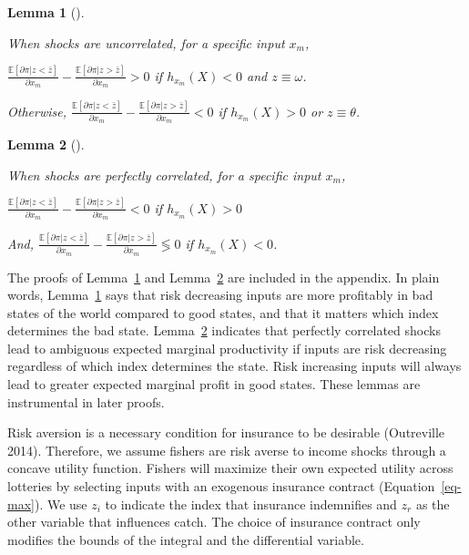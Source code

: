 \documentclass[
  letterpaper,
  DIV=11,
  numbers=noendperiod]{scrartcl}
\theoremstyle{plain}
\newtheorem{lemma}{Lemma}[section]
\theoremstyle{plain}
\theoremstyle{remark}
\begin{document}
\begin{lemma}[]\protect\hypertarget{lem-mp}{}\label{lem-mp}

When shocks are uncorrelated, for a specific input \(x_m\),

\(\frac{\mathbb{E}[\partial \pi|z<\bar z]}{\partial x_m}-\frac{\mathbb{E}[\partial \pi|z>\bar z]}{\partial x_m}>0\)
if \(h_{x_m}(X)<0\) and \(z\equiv\omega\).

Otherwise,
\(\frac{\mathbb{E}[\partial \pi|z<\bar z]}{\partial x_m}-\frac{\mathbb{E}[\partial \pi|z>\bar z]}{\partial x_m}<0\)
if \(h_{x_m}(X)>0\) or \(z\equiv \theta\).

\end{lemma}

\begin{lemma}[]\protect\hypertarget{lem-corr}{}\label{lem-corr}

When shocks are perfectly correlated, for a specific input \(x_m\),

\(\frac{\mathbb{E}[\partial \pi|z<\bar z]}{\partial x_m}-\frac{\mathbb{E}[\partial \pi|z>\bar z]}{\partial x_m}<0\)
if \(h_{x_m}(X)>0\)

And,
\(\frac{\mathbb{E}[\partial \pi|z<\bar z]}{\partial x_m}-\frac{\mathbb{E}[\partial \pi|z>\bar z]}{\partial x_m}\lessgtr 0\)
if \(h_{x_m}(X)<0\).

\end{lemma}

The proofs of Lemma~\ref{lem-mp} and Lemma~\ref{lem-corr} are included
in the appendix. In plain words, Lemma~\ref{lem-mp} says that risk
decreasing inputs are more profitably in bad states of the world
compared to good states, and that it matters which index determines the
bad state. Lemma~\ref{lem-corr} indicates that perfectly correlated
shocks lead to ambiguous expected marginal productivity if inputs are
risk decreasing regardless of which index determines the state. Risk
increasing inputs will always lead to greater expected marginal profit
in good states. These lemmas are instrumental in later proofs.

Risk aversion is a necessary condition for insurance to be desirable
(Outreville 2014). Therefore, we assume fishers are risk averse to
income shocks through a concave utility function. Fishers will maximize
their own expected utility across lotteries by selecting inputs with an
exogenous insurance contract (Equation~\ref{eq-max}). We use \(z_i\) to
indicate the index that insurance indemnifies and \(z_r\) as the other
variable that influences catch. The choice of insurance contract only
modifies the bounds of the integral and the differential variable.
\end{document}
